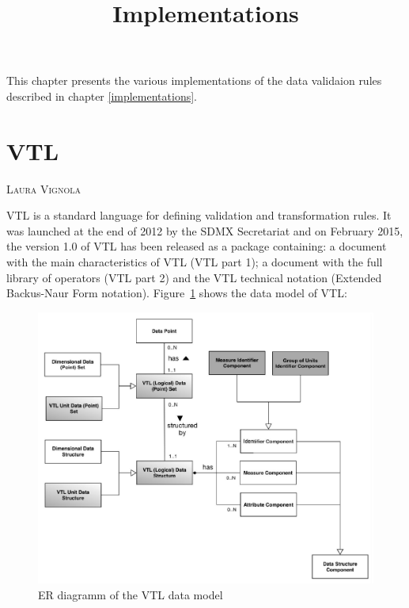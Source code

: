 \title{Implementations}

\vspace{0.6 cm}

\noindent
This chapter presents the various implementations of the data validaion rules described in chapter \ref{implementations}.

\section{VTL}

\textsc{Laura Vignola}
\vspace{0.6 cm}

VTL is a standard language for defining validation and transformation rules. It was launched at the end of 2012 by the SDMX Secretariat and on February 2015, the version 1.0 of VTL has been released as a package containing: a document with the main characteristics of VTL (VTL part 1); a document with the full library of operators (VTL part 2) and the VTL technical notation (Extended Backus-Naur Form notation). Figure~\ref{vtldatamod} shows the data model of VTL:

\begin{figure}[!ht]
\begin{center}
\includegraphics[scale=0.5]{fig/vtldatamod.png} 
\end{center}
\caption{ER diagramm of the VTL data model}
\label{vtldatamod}
\end{figure}

